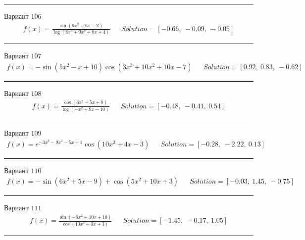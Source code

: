 \documentclass[11pt]{report}
\begin{document}
\begin{center}
    \noindent\rule{8cm}{0.4pt}
\end{center}
Вариант \(106\)
\begin{align*}
    f(x) = \frac{\sin{\left(9 x^{2} + 6 x - 2 \right)}}{\log{\left(8 x^{3} + 9 x^{2} + 8 x + 4 \right)}} && Solution = \left[ -0.66, \  -0.09, \  -0.05\right]
\end{align*}
\begin{center}
    \noindent\rule{8cm}{0.4pt}
\end{center}
Вариант \(107\)
\begin{align*}
    f(x) = - \sin{\left(5 x^{2} - x + 10 \right)} \cos{\left(3 x^{3} + 10 x^{2} + 10 x - 7 \right)} && Solution = \left[ 0.92, \  0.83, \  -0.62\right]
\end{align*}
\begin{center}
    \noindent\rule{8cm}{0.4pt}
\end{center}
Вариант \(108\)
\begin{align*}
    f(x) = \frac{\cos{\left(6 x^{2} - 5 x + 8 \right)}}{\log{\left(- x^{2} + 9 x - 10 \right)}} && Solution = \left[ -0.48, \  -0.41, \  0.54\right]
\end{align*}
\begin{center}
    \noindent\rule{8cm}{0.4pt}
\end{center}
Вариант \(109\)
\begin{align*}
    f(x) = e^{- 3 x^{3} - 9 x^{2} - 5 x + 1} \cos{\left(10 x^{2} + 4 x - 3 \right)} && Solution = \left[ -0.28, \  -2.22, \  0.13\right]
\end{align*}
\begin{center}
    \noindent\rule{8cm}{0.4pt}
\end{center}
Вариант \(110\)
\begin{align*}
    f(x) = - \sin{\left(6 x^{2} + 5 x - 9 \right)} + \cos{\left(5 x^{2} + 10 x + 3 \right)} && Solution = \left[ -0.03, \  1.45, \  -0.75\right]
\end{align*}
\begin{center}
    \noindent\rule{8cm}{0.4pt}
\end{center}
Вариант \(111\)
\begin{align*}
    f(x) = \frac{\sin{\left(- 6 x^{2} + 10 x + 10 \right)}}{\cos{\left(10 x^{2} + 3 x + 3 \right)}} && Solution = \left[ -1.45, \  -0.17, \  1.05\right]
\end{align*}
\begin{center}
    \noindent\rule{8cm}{0.4pt}
\end{center}
\end{document}
